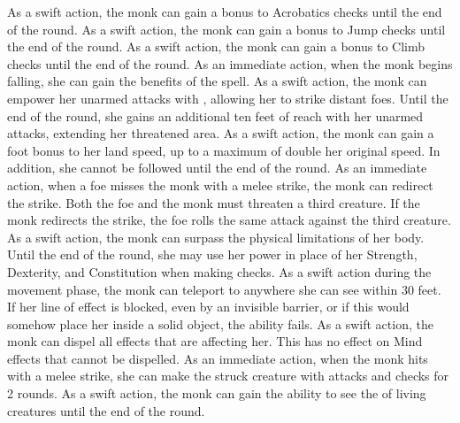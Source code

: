         As a swift action, the monk can gain a  bonus to Acrobatics checks until the end of the round.
        As a swift action, the monk can gain a  bonus to Jump checks until the end of the round.
        As a swift action, the monk can gain a  bonus to Climb checks until the end of the round.
        As an immediate action, when the monk begins falling, she can gain the benefits of the  spell.
        As a swift action, the monk can empower her unarmed attacks with \ki, allowing her to strike distant foes.
        Until the end of the round, she gains an additional ten feet of reach with her unarmed attacks, extending her threatened area.
        As a swift action, the monk can gain a  foot bonus to her land speed, up to a maximum of double her original speed.
        In addition, she cannot be followed until the end of the round.
        As an immediate action, when a foe misses the monk with a melee strike, the monk can redirect the strike.
        Both the foe and the monk must threaten a third creature.
        If the monk redirects the strike, the foe rolls the same attack against the third creature.
        As a swift action, the monk can surpass the physical limitations of her body.
        Until the end of the round, she may use her \ki power in place of her Strength, Dexterity, and Constitution when making checks.
        As a swift action during the movement phase, the monk can teleport to anywhere she can see within 30 feet.
        If her line of effect is blocked, even by an invisible barrier, or if this would somehow place her inside a solid object, the ability fails.
        As a swift action, the monk can dispel all  effects that are affecting her.
        This has no effect on Mind effects that cannot be dispelled.
        As an immediate action, when the monk hits with a melee strike, she can make the struck creature \impaired with attacks and checks for 2 rounds.
        As a swift action, the monk can gain the ability to see the \ki of living creatures until the end of the round.
